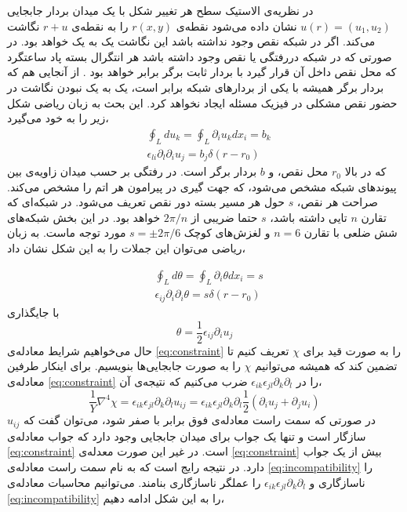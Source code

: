 

در نظریه‌ی الاستیک سطح هر تغییر شکل با یک میدان بردار جابجایی 
$u(r)=(u_1,u_2)$
نشان داده می‌شود نقطه‌ی 
$r(x,y)$
را به نقطه‌ی 
$r+u$
نگاشت می‌کند. اگر در شبکه نقص وجود نداشته باشد این نگاشت یک به یک خواهد بود. در صورتی که در شبکه دررفتگی
یا نقص وجود داشته باشد هر انتگرال بسته پاد ساعتگرد که محل نقص داخل آن قرار گیرد با بردار ثابت برگر
برابر خواهد بود
\cite{mitchell1961}.
از آنجایی هم که بردار برگر همیشه با یکی از بردارهای شبکه برابر است، یک به یک نبودن نگاشت در حضور نقص مشکلی در فیزیک مسئله ایجاد نخواهد کرد. این بحث به زبان ریاضی شکل زیر را به خود می‌گیرد،
\begin{equation}
\begin{aligned}
&\oint_Ldu_k=\oint_L\partial_iu_kdx_i=b_k\\
&\epsilon_{li}\partial_l\partial_iu_j=b_j\delta(r-r_0)
\end{aligned}
\end{equation}
که در بالا 
$r_0$
محل نقص، و 
$b$
 بردار برگر است. در رفتگی  بر حسب میدان زاویه‌ی بین پیوندهای شبکه مشخص می‌شود، که جهت گیری در پیرامون هر اتم را مشخص می‌کند. صراحت هر نقص،
 $s$
 حول هر مسیر بسته دور نقص تعریف می‌شود. در شبکه‌ای که تقارن $n$
 تایی داشته باشد، 
 $s$ حتما ضریبی از 
 $2\pi/n$ خواهد بود.
 در این بخش شبکه‌های شش ضلعی با تقارن 
 $n=6$
و لغزش‌های کوچک
$s=\pm2\pi/6$
مورد توجه ماست. به زبان ریاضی می‌توان این جملات را به این شکل نشان داد،

 \begin{equation}
\begin{aligned}
&\oint_Ld\theta=\oint_L\partial_i\theta dx_i=s\\
&\epsilon_{ij}\partial_i\partial_i\theta=s\delta(r-r_0)
\label{eq:thetauij}
\end{aligned}
\end{equation}
با جایگذاری
\begin{equation}
\theta=\frac{1}{2}\epsilon_{ij}\partial_iu_j
\end{equation}
حال می‌خواهیم شرایط معادله‌ی 
\ref{eq:constraint}
را به صورت قید برای $\chi$
تعریف کنیم تا تضمین کند که همیشه می‌توانیم $\chi$
را به صورت جابجایی‌ها بنویسیم. برای اینکار طرفین معادله‌ی 
\ref{eq:constraint}
را در 
$\epsilon_{ik}\epsilon_{jl}\partial_k\partial_l$
ضرب می‌کنیم که نتیجه‌ی آن،
\begin{equation}
\frac{1}{Y}\nabla^4\chi=\epsilon_{ik}\epsilon_{jl}\partial_k\partial_lu_{ij}=\epsilon_{ik}\epsilon_{jl}\partial_k\partial_l\frac{1}{2}(\partial_iu_j+\partial_ju_i)
\label{eq:incompatibility}
\end{equation}
در صورتی که سمت راست معادله‌ی فوق برابر با صفر شود، می‌توان گفت که $u_{ij}$ 
سازگار است و تنها یک جواب برای میدان جابجایی وجود دارد که جواب معادله‌ی 
\ref{eq:constraint}
است. در غیر این صورت معدله‌ی 
\ref{eq:constraint}
بیش از یک جواب دارد. در نتیجه رایج است که به نام سمت راست معادله‌ی
\ref{eq:incompatibility}
را ناسازگاری
و $\epsilon_{ik}\epsilon_{jl}\partial_k\partial_l$
را عملگر ناسازگاری بنامند. می‌توانیم محاسبات معادله‌ی 
\ref{eq:incompatibility}
را به این شکل ادامه دهیم،

